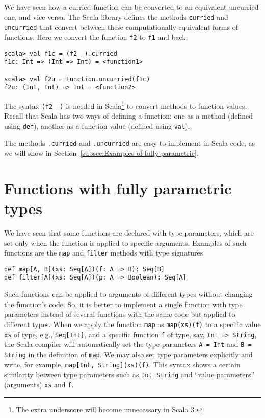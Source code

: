 We have seen how a curried function can be converted to an equivalent
uncurried one, and vice versa. The Scala library defines the methods
\lstinline!curried! and \lstinline!uncurried! that convert between
these computationally equivalent forms of functions. Here we convert
the function \lstinline!f2! to \lstinline!f1! and back:
\begin{lstlisting}
scala> val f1c = (f2 _).curried
f1c: Int => (Int => Int) = <function1>

scala> val f2u = Function.uncurried(f1c)
f2u: (Int, Int) => Int = <function2> 
\end{lstlisting}

The syntax \lstinline!(f2 _)! is needed in Scala\footnote{The extra underscore will become unnecessary in Scala 3.}
to convert methods to function values. Recall that Scala has two ways
of defining a function: one as a method (defined
using \lstinline!def!), another as a function value
(defined using \lstinline!val!). 

The methods \lstinline!.curried! and \lstinline!.uncurried! are
easy to implement in Scala code, as we will show in Section~\ref{subsec:Examples-of-fully-parametric}.

\section{Functions with fully parametric types}

We have seen that some functions are declared with type parameters,
which are set only when the function is applied to specific arguments.
Examples of such functions are the \lstinline!map! and \lstinline!filter!
methods with type signatures
\begin{lstlisting}
def map[A, B](xs: Seq[A])(f: A => B): Seq[B]
def filter[A](xs: Seq[A])(p: A => Boolean): Seq[A]
\end{lstlisting}
Such functions can be applied to arguments of different types without
changing the function's code. So, it is better to implement a single
function with type parameters instead of several functions with the
same code but applied to different types. When we apply the function
\lstinline!map! as \lstinline!map(xs)(f)! to a specific value \lstinline!xs!
of type, e.g., \lstinline!Seq[Int]!, and a specific function \lstinline!f!
of type, say, \lstinline!Int => String!, the Scala compiler will
automatically set the type parameters \lstinline!A = Int! and \lstinline!B = String!
in the definition of \lstinline!map!. We may also set type parameters
explicitly and write, for example, \lstinline!map[Int, String](xs)(f)!.
This syntax shows a certain similarity between type parameters such
as \lstinline!Int!, \lstinline!String! and ``value parameters''
(arguments) \lstinline!xs! and \lstinline!f!.

